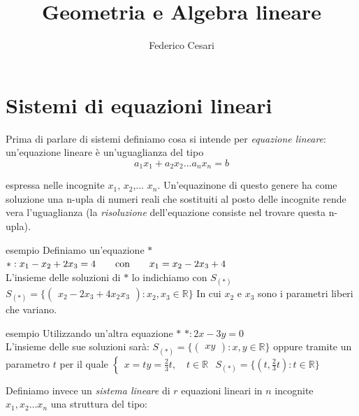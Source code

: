 \documentclass[x11names]{article}
\title{Geometria e Algebra lineare}
\author{Federico Cesari}
\date{}
\begin{document}

\tableofcontents
\newpage








\newpage
\section{Sistemi di equazioni lineari}
 Prima di parlare di sistemi definiamo cosa si intende per \textit{equazione lineare}: un'equazione lineare è un'uguaglianza del tipo  
 $$a_{1}x_{1} + a_{2}x_{2}... a_nx_n=b$$ 

 espressa nelle incognite $x_1$, $x_2$,... $x_n$. Un'equazinone di questo genere ha come soluzione una n-upla di numeri reali che sostituiti al posto delle incognite rende vera l'uguaglianza (la \textit{risoluzione} dell'equazione consiste nel trovare questa n-upla).

 \begin{es}{esempio}
     Definiamo un'equazione $*$ 
     $*:x_1 - x_2 + 2x_3 = 4 \qquad \textnormal{con} \qquad x_1 = x_2 - 2x_3 + 4$  \\
     L'insieme delle soluzioni di $*$ lo indichiamo con $S_{(*)}$ 
      $S_{(*)} = \Biggl\{\begin{pmatrix}x_2 - 2x_3 + 4 x_2  x_3 \end{pmatrix}: x_2, x_3 \in \mathbb{R}\Biggl\} $ 
      In cui $x_2$ e $x_3$ sono i parametri liberi che variano.
 \end{es}

 \begin{es}{esempio}
     Utilizzando un'altra equazione $*$ 
     $*: 2x - 3y = 0$  \\
     L'insieme delle sue soluzioni sarà: 
     $S_{(*)} = \Biggl\{\begin{pmatrix}x  y \end{pmatrix}: x,y \in \mathbb{R}\Biggl\} $ 
     oppure tramite un parametro $t$ per il quale $\begin{cases}x=ty=\frac{2}{3}t ,\quad t \in \mathbb{R}\end{cases}$ 
      $S_{(*)} = \biggl\{(t,\frac{2}{3}t): t \in \mathbb{R}\biggl\} $
 \end{es}

 \vspace{2em}
 Definiamo invece un \textit{sistema lineare} di $r$ equazioni lineari in $n$ incognite $x_1, x_2 \dots x_n$ una struttura del tipo:
\end{document}
